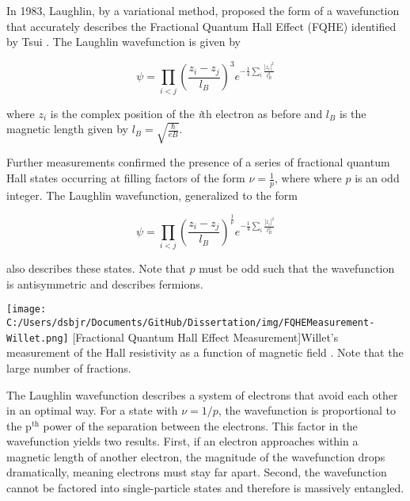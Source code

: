 In 1983, Laughlin, by a variational method, proposed the form of a wavefunction that accurately describes the Fractional Quantum Hall Effect (FQHE) identified by Tsui \cite{Laughlin1983}. The Laughlin wavefunction is given by

\begin{equation}
\psi = \prod_{i < j} \left( \frac{z_{i} - z_{j}}{l_{B}} \right)^{3} e^{-\frac{1}{4} \sum_{i} \frac{|z_{i}|^{2}}{l_{B}^{2}}}
\end{equation}

where $z_{i}$ is the complex position of the \textit{i}th electron as before and $l_{B}$ is the magnetic length given by $l_{B} = \sqrt{\frac{\hbar}{eB}}$.

Further measurements confirmed the presence of a series of fractional quantum Hall states occurring at filling factors of the form $\nu = \frac{1}{p}$, where where $p$ is an odd integer. The Laughlin wavefunction, generalized to the form

\begin{equation}
\psi = \prod_{i < j} \left( \frac{z_{i} - z_{j}}{l_{B}} \right)^{\frac{1}{\nu}} e^{-\frac{1}{4} \sum_{i} \frac{|z_{i}|^{2}}{l_{B}^{2}}}
\end{equation}

also describes these states. Note that $p$ must be odd such that the wavefunction is antisymmetric and describes fermions.

\begin{centering}
\texttt{[image: C:/Users/dsbjr/Documents/GitHub/Dissertation/img/FQHEMeasurement-Willet.png]}
  \captionsetup{width=0.75\textwidth}
  [Fractional Quantum Hall Effect Measurement]{Willet's measurement of the Hall resistivity as a function of magnetic field \cite{Willet1987}. Note that the large number of fractions.}
  \label{fig:FQHE1}
\end{centering}

The Laughlin wavefunction describes a system of electrons that avoid each other in an optimal way. For a state with $\nu = 1/p$, the wavefunction is proportional to the p$^{\text{th}}$ power of the separation between the electrons. This factor in the wavefunction yields two results. First, if an electron approaches within a magnetic length of another electron, the magnitude of the wavefunction drops dramatically, meaning electrons must stay far apart. Second, the wavefunction cannot be factored into single-particle states and therefore is massively entangled.

